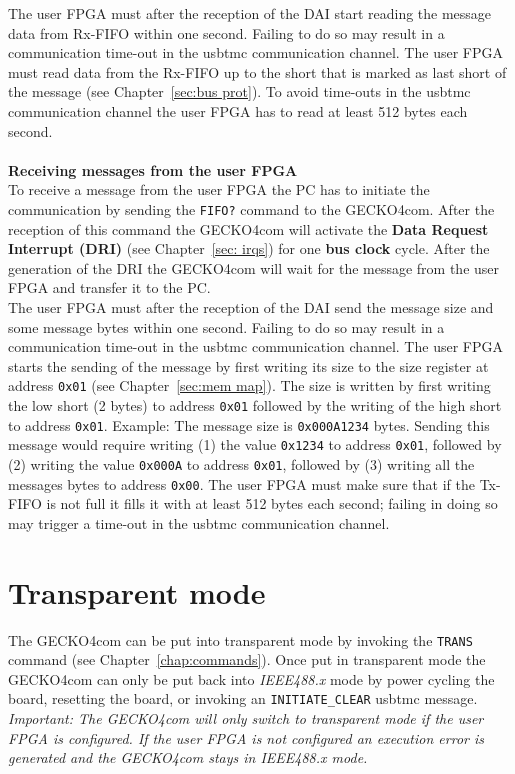 The user FPGA {\sc must} after the reception of the DAI start reading the
message data from Rx-FIFO within one second. Failing to do so may result in a
communication time-out in the {\sc usbtmc} communication channel. The user FPGA
must read data from the Rx-FIFO up to the short that is marked as last
short of the message (see Chapter~\ref{sec:bus prot}). To avoid time-outs in the
{\sc usbtmc} communication channel the user FPGA has to read at least 512 bytes
each second.\\
 \\
\textbf{Receiving messages from the user FPGA}\\
To receive a message from the user FPGA the PC has to initiate the communication
by sending the \verb+FIFO?+ command to the {\sc GECKO4com}. After the reception
of this command the {\sc GECKO4com} will activate the \textbf{Data Request
Interrupt (DRI)} (see Chapter~\ref{sec: irqs}) for one \textbf{bus clock} cycle.
After the generation of the DRI the {\sc GECKO4com} will wait for the message
from the user FPGA and transfer it to the PC.\\
The user FPGA must after the reception of the DAI send the message size
and some message bytes within one second. Failing to do so may result in a
communication time-out in the {\sc usbtmc} communication channel. The user FPGA
starts the sending of the message by first writing its size to the size register
at address \verb+0x01+ (see Chapter~\ref{sec:mem map}). The size is written by
first writing the low short (2 bytes) to address \verb+0x01+ followed by the
writing of the high short to address \verb+0x01+. Example: The message size is
\verb+0x000A1234+ bytes. Sending this message would require writing (1) the
value \verb+0x1234+ to address \verb+0x01+, followed by (2) writing the value
\verb+0x000A+ to address \verb+0x01+, followed by (3) writing all the messages
bytes to address \verb+0x00+. The user FPGA must make sure that if the Tx-FIFO
is not full it fills it with at least 512 bytes each second; failing in doing so
may trigger a time-out in the {\sc usbtmc} communication channel.
\section{Transparent mode}
\label{sec:trans mode}
The {\sc GECKO4com} can be put into transparent mode by invoking the
\verb+TRANS+ command (see Chapter~\ref{chap:commands}). Once put in transparent
mode the {\sc GECKO4com} can only be put back into \emph{IEEE488.x} mode by power
cycling the board, resetting the board, or invoking an \verb+INITIATE_CLEAR+
{\sc usbtmc} message.\\
\textit{Important: The {\sc GECKO4com} will only switch to transparent mode if
the user FPGA is configured. If the user FPGA is not configured an execution
error is generated and the {\sc GECKO4com} stays in IEEE488.x mode.\important}\\

